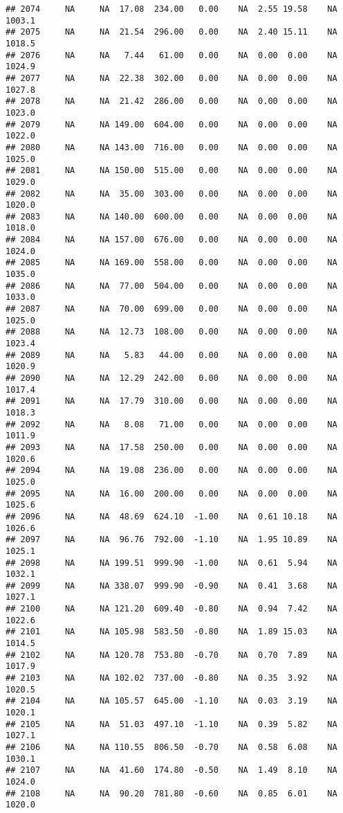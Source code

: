\documentclass{article}\usepackage{graphicx, color}
\makeatletter
\newenvironment{kframe}{%
 \def\at@end@of@kframe{}%
 \ifinner\ifhmode%
  \def\at@end@of@kframe{\end{minipage}}%
  \begin{minipage}{\columnwidth}%
 \fi\fi%
 \def\FrameCommand##1{\hskip\@totalleftmargin \hskip-\fboxsep
 \colorbox{shadecolor}{##1}\hskip-\fboxsep
     \hskip-\linewidth \hskip-\@totalleftmargin \hskip\columnwidth}%
 \MakeFramed {\advance\hsize-\width
   \@totalleftmargin\z@ \linewidth\hsize
   \@setminipage}}%
 {\par\unskip\endMakeFramed%
 \at@end@of@kframe}
\newenvironment{knitrout}{}{} %
\makeatother
\begin{document}
\begin{knitrout}
\begin{kframe}
\begin{verbatim}
## 2074     NA     NA  17.08  234.00   0.00    NA  2.55 19.58    NA 1003.1
## 2075     NA     NA  21.54  296.00   0.00    NA  2.40 15.11    NA 1018.5
## 2076     NA     NA   7.44   61.00   0.00    NA  0.00  0.00    NA 1024.9
## 2077     NA     NA  22.38  302.00   0.00    NA  0.00  0.00    NA 1027.8
## 2078     NA     NA  21.42  286.00   0.00    NA  0.00  0.00    NA 1023.0
## 2079     NA     NA 149.00  604.00   0.00    NA  0.00  0.00    NA 1022.0
## 2080     NA     NA 143.00  716.00   0.00    NA  0.00  0.00    NA 1025.0
## 2081     NA     NA 150.00  515.00   0.00    NA  0.00  0.00    NA 1029.0
## 2082     NA     NA  35.00  303.00   0.00    NA  0.00  0.00    NA 1020.0
## 2083     NA     NA 140.00  600.00   0.00    NA  0.00  0.00    NA 1018.0
## 2084     NA     NA 157.00  676.00   0.00    NA  0.00  0.00    NA 1024.0
## 2085     NA     NA 169.00  558.00   0.00    NA  0.00  0.00    NA 1035.0
## 2086     NA     NA  77.00  504.00   0.00    NA  0.00  0.00    NA 1033.0
## 2087     NA     NA  70.00  699.00   0.00    NA  0.00  0.00    NA 1025.0
## 2088     NA     NA  12.73  108.00   0.00    NA  0.00  0.00    NA 1023.4
## 2089     NA     NA   5.83   44.00   0.00    NA  0.00  0.00    NA 1020.9
## 2090     NA     NA  12.29  242.00   0.00    NA  0.00  0.00    NA 1017.4
## 2091     NA     NA  17.79  310.00   0.00    NA  0.00  0.00    NA 1018.3
## 2092     NA     NA   8.08   71.00   0.00    NA  0.00  0.00    NA 1011.9
## 2093     NA     NA  17.58  250.00   0.00    NA  0.00  0.00    NA 1020.6
## 2094     NA     NA  19.08  236.00   0.00    NA  0.00  0.00    NA 1025.0
## 2095     NA     NA  16.00  200.00   0.00    NA  0.00  0.00    NA 1025.6
## 2096     NA     NA  48.69  624.10  -1.00    NA  0.61 10.18    NA 1026.6
## 2097     NA     NA  96.76  792.00  -1.10    NA  1.95 10.89    NA 1025.1
## 2098     NA     NA 199.51  999.90  -1.00    NA  0.61  5.94    NA 1032.1
## 2099     NA     NA 338.07  999.90  -0.90    NA  0.41  3.68    NA 1027.1
## 2100     NA     NA 121.20  609.40  -0.80    NA  0.94  7.42    NA 1022.6
## 2101     NA     NA 105.98  583.50  -0.80    NA  1.89 15.03    NA 1014.5
## 2102     NA     NA 120.78  753.80  -0.70    NA  0.70  7.89    NA 1017.9
## 2103     NA     NA 102.02  737.00  -0.80    NA  0.35  3.92    NA 1020.5
## 2104     NA     NA 105.57  645.00  -1.10    NA  0.03  3.19    NA 1020.1
## 2105     NA     NA  51.03  497.10  -1.10    NA  0.39  5.82    NA 1027.1
## 2106     NA     NA 110.55  806.50  -0.70    NA  0.58  6.08    NA 1030.1
## 2107     NA     NA  41.60  174.80  -0.50    NA  1.49  8.10    NA 1024.0
## 2108     NA     NA  90.20  781.80  -0.60    NA  0.85  6.01    NA 1020.0

\end{verbatim}
\end{kframe}
\end{knitrout}
\end{document}
